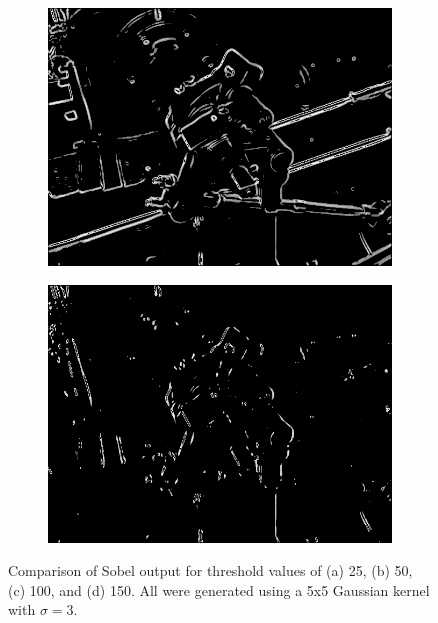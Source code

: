 \documentclass[12pt]{article}
\begin{document}
\begin{figure}[H]
\begin{subfigure}[b]{0.45\linewidth}
				\subcaption{}
				\label{fig:sobelThreshCmp50}
			\end{subfigure} %
			\begin{subfigure}[b]{0.45\linewidth}
				\includegraphics[width=1\linewidth,keepaspectratio]{../examples/valve/valve_gaussian-5x5_thresh-100}
				\subcaption{}
				\label{fig:sobelThreshCmp100}
			\end{subfigure} %
			\begin{subfigure}[b]{0.45\linewidth}
				\includegraphics[width=1\linewidth,keepaspectratio]{../examples/valve/valve_gaussian-5x5_thresh-150}
				\subcaption{}
				\label{fig:sobelThreshCmp150}
			\end{subfigure} %
			\caption{\small Comparison of Sobel output for threshold values of (a) 25, (b) 50, (c) 100, and (d) 150. All were generated using a 5x5 Gaussian kernel with $\sigma = 3$.}
			\label{fig:sobelThreshCmp}
		\end{figure} %
\end{document}
